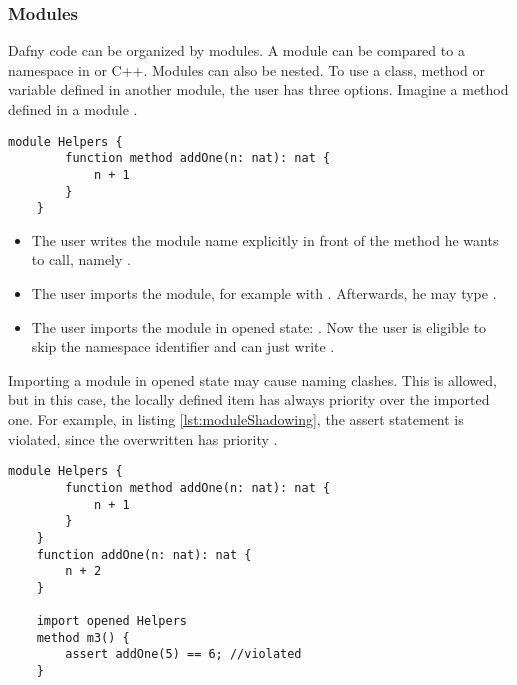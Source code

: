 \subsubsection{Modules}

Dafny code can be organized by modules. A module can be compared to a namespace in \Csharp or C++.
Modules can also be nested. To use a class, method or variable defined in another module, the user has three options.
Imagine a method  defined in a module .

\begin{lstlisting}[language=dafny, caption={Module Example}, captionpos=b, label={lst:addOneMethod}]
    module Helpers {
        function method addOne(n: nat): nat {
            n + 1
        }
    }
\end{lstlisting}

\begin{itemize}
    \item The user writes the module name explicitly in front of the method he wants to call, \linebreak namely .
    \item The user imports the module, for example with .
    Afterwards, he may type .
    \item The user imports the module in opened state: .
    Now the user is eligible to skip the namespace identifier and can just write .
\end{itemize}

Importing a module in opened state may cause naming clashes.
This is allowed, but in this case, the locally defined item has always priority over the imported one.
For example, in listing \ref{lst:moduleShadowing}, the assert statement is violated, since the overwritten  has priority \cite{functionVSMethod}.

\begin{lstlisting}[language = dafny, caption={Naming Clash}, captionpos=b, label={lst:moduleShadowing}]
    module Helpers {
        function method addOne(n: nat): nat {
            n + 1
        }
    }
    function addOne(n: nat): nat {
        n + 2
    }

    import opened Helpers
    method m3() {
        assert addOne(5) == 6; //violated
    }

\end{lstlisting}

